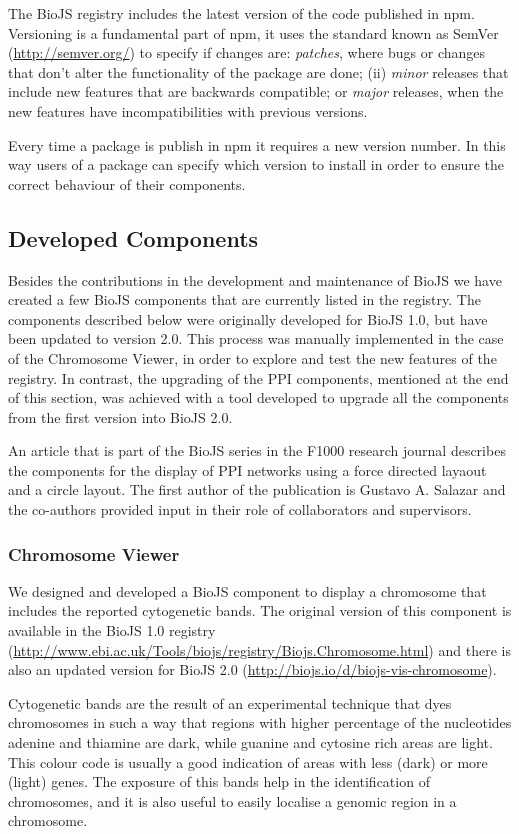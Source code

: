 The BioJS registry includes the latest version of the code published in npm. Versioning is a fundamental part of npm, it uses the standard known as SemVer (\url{http://semver.org/}) to specify if changes are: \emph{patches}, where bugs or changes that don't alter the functionality of the package are done; (ii) \emph{minor} releases that include new features that are backwards compatible; or  \emph{major} releases, when the new features have incompatibilities with previous versions.

Every time a package is publish in npm it requires a new version number. In this way users of a package can specify which version to install in order to ensure the correct behaviour of their components.

\subsection{Developed Components} \label{subsec:biojs_components}
Besides the contributions in the development and maintenance of BioJS we have created a few BioJS components that are currently listed in the registry. The components described below were originally developed for BioJS 1.0, but have been updated to version 2.0. This process was manually implemented in the case of the Chromosome Viewer, in order to explore and test the new features of the registry. In contrast, the upgrading of the PPI components, mentioned at the end of this section, was achieved with a tool developed to upgrade all the components from the first version into BioJS 2.0.

An article that is part of the BioJS series in the F1000 research journal describes the components for the display of PPI networks using a force directed layaout and a circle layout. The first author of the publication is Gustavo A. Salazar and the co-authors provided input in their role of collaborators and supervisors.

\subsubsection{Chromosome Viewer}
We designed and developed a BioJS component to display a chromosome that includes the reported cytogenetic bands. The original version of this component is available in the BioJS 1.0 registry (\url{http://www.ebi.ac.uk/Tools/biojs/registry/Biojs.Chromosome.html}) and there is also an updated version for  BioJS 2.0 (\url{http://biojs.io/d/biojs-vis-chromosome}).

Cytogenetic bands are the result of an experimental technique that dyes chromosomes in such a way that regions with higher percentage of the nucleotides adenine and thiamine are dark, while guanine and cytosine rich areas are light. This colour code is usually a good indication of areas with less (dark) or more (light) genes. The exposure of this bands help in the identification of chromosomes, and it is also useful to easily localise a genomic region in a chromosome.

